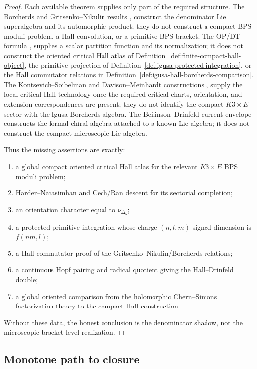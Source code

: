 \begin{proof}
Each available theorem supplies only part of the required structure.
The Borcherds and Gritsenko--Nikulin results \cite{B}, \cite{GN}
construct the denominator Lie superalgebra and its automorphic product;
they do not construct a compact BPS moduli problem, a Hall convolution,
or a primitive BPS bracket.  The OP/DT formula \cite{OB}, \cite{OPand}
supplies a scalar partition function and its normalization; it does not
construct the oriented critical Hall atlas of
Definition~\ref{def:finite-compact-hall-object}, the primitive
projection of Definition~\ref{def:igusa-protected-integration}, or the
Hall commutator relations in
Definition~\ref{def:igusa-hall-borcherds-comparison}.  The
Kontsevich--Soibelman and Davison--Meinhardt constructions
\cite{KSCoHA}, \cite{DavisonMeinhardtCoHA} supply the local
critical-Hall technology once the required critical charts, orientation,
and extension correspondences are present; they do not identify the
compact \(K3\times E\) sector with the Igusa Borcherds algebra.  The
Beilinson--Drinfeld current envelope \cite{BD} constructs the formal
chiral algebra attached to a known Lie algebra; it does not construct
the compact microscopic Lie algebra.

Thus the missing assertions are exactly:
\begin{enumerate}
\item a global compact oriented critical Hall atlas for the relevant
  \(K3\times E\) BPS moduli problem;
\item Harder--Narasimhan and Cech/Ran descent for its sectorial
  completion;
\item an orientation character equal to \(\nu_{\Delta_5}\);
\item a protected primitive integration whose charge-\((n,l,m)\) signed
  dimension is \(f(nm,l)\);
\item a Hall-commutator proof of the Gritsenko--Nikulin/Borcherds
  relations;
\item a continuous Hopf pairing and radical quotient giving the
  Hall--Drinfeld double;
\item a global oriented comparison from the holomorphic Chern--Simons
  factorization theory to the compact Hall construction.
\end{enumerate}
Without these data, the honest conclusion is the denominator shadow, not
the microscopic bracket-level realization.
\end{proof}

\subsection{Monotone path to closure}

